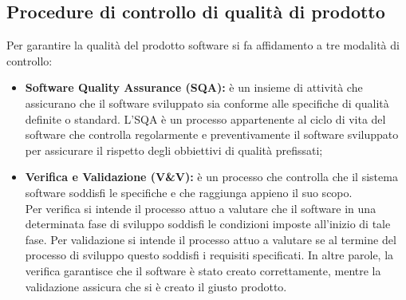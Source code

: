 	\subsection{Procedure di controllo di qualità di prodotto}
	Per garantire la qualità del prodotto software si fa affidamento a tre modalità di controllo:
		\begin{itemize}
			\item \textbf{Software Quality Assurance (SQA):} è un insieme di attività che assicurano che il software sviluppato sia conforme alle specifiche di qualità definite o standard. L'SQA è un processo appartenente al ciclo di vita del software che controlla regolarmente e preventivamente il software sviluppato per assicurare il rispetto degli obbiettivi di qualità prefissati;
			\item \textbf{Verifica e Validazione (V\&V):} è un processo che controlla che il sistema software soddisfi le specifiche e che raggiunga appieno il suo scopo.\\
			Per verifica si intende il processo attuo a valutare che il software in una determinata fase di sviluppo soddisfi le condizioni imposte all'inizio di tale fase. Per validazione si intende il processo attuo a valutare se al termine del processo di sviluppo questo soddisfi i requisiti specificati. In altre parole, la verifica garantisce che il software è stato creato correttamente, mentre la validazione assicura che si è creato il giusto prodotto.
		\end{itemize}
	
	\pagebreak
